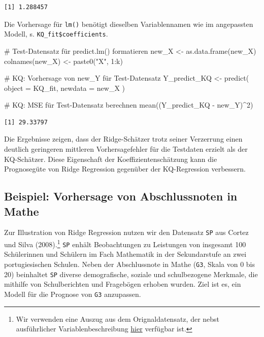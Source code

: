 \documentclass[
  a4paper,
  DIV=11,
  oneside]{scrreprt}
\newenvironment{Shaded}{\begin{snugshade}}{\end{snugshade}}
\newcommand{\AttributeTok}[1]{\textcolor[rgb]{0.40,0.45,0.13}{#1}}
\newcommand{\CommentTok}[1]{\textcolor[rgb]{0.37,0.37,0.37}{#1}}
\newcommand{\DecValTok}[1]{\textcolor[rgb]{0.68,0.00,0.00}{#1}}
\newcommand{\FunctionTok}[1]{\textcolor[rgb]{0.28,0.35,0.67}{#1}}
\newcommand{\NormalTok}[1]{\textcolor[rgb]{0.00,0.23,0.31}{#1}}
\newcommand{\OtherTok}[1]{\textcolor[rgb]{0.00,0.23,0.31}{#1}}
\newcommand{\SpecialCharTok}[1]{\textcolor[rgb]{0.37,0.37,0.37}{#1}}
\newcommand{\StringTok}[1]{\textcolor[rgb]{0.13,0.47,0.30}{#1}}
\begin{document}
\begin{verbatim}
[1] 1.288457
\end{verbatim}

Die Vorhersage für \texttt{lm()} benötigt dieselben Variablennamen wie
im angepassten Modell, s. \texttt{KQ\_fit\$coefficients}.

\begin{Shaded}
\begin{Highlighting}[]
\CommentTok{\# Test{-}Datensatz für predict.lm() formatieren}
\NormalTok{new\_X }\OtherTok{\textless{}{-}} \FunctionTok{as.data.frame}\NormalTok{(new\_X)}
\FunctionTok{colnames}\NormalTok{(new\_X) }\OtherTok{\textless{}{-}} \FunctionTok{paste0}\NormalTok{(}\StringTok{"X"}\NormalTok{, }\DecValTok{1}\SpecialCharTok{:}\NormalTok{k)}

\CommentTok{\# KQ: Vorhersage von new\_Y für Test{-}Datensatz}
\NormalTok{Y\_predict\_KQ }\OtherTok{\textless{}{-}} \FunctionTok{predict}\NormalTok{(}
  \AttributeTok{object =}\NormalTok{ KQ\_fit, }
  \AttributeTok{newdata =}\NormalTok{ new\_X}
\NormalTok{)}

\CommentTok{\# KQ: MSE für Test{-}Datensatz berechnen}
\FunctionTok{mean}\NormalTok{((Y\_predict\_KQ }\SpecialCharTok{{-}}\NormalTok{ new\_Y)}\SpecialCharTok{\^{}}\DecValTok{2}\NormalTok{)}
\end{Highlighting}
\end{Shaded}

\begin{verbatim}
[1] 29.33797
\end{verbatim}

Die Ergebnisse zeigen, dass der Ridge-Schätzer trotz seiner Verzerrung
einen deutlich geringeren mittleren Vorhersagefehler für die Testdaten
erzielt als der KQ-Schätzer. Diese Eigenschaft der
Koeffizientenschätzung kann die Prognosegüte von Ridge Regression
gegenüber der KQ-Regression verbessern.

\hypertarget{beispiel-vorhersage-von-abschlussnoten-in-mathe}{%
\subsection{Beispiel: Vorhersage von Abschlussnoten in
Mathe}\label{beispiel-vorhersage-von-abschlussnoten-in-mathe}}

Zur Illustration von Ridge Regression nutzen wir den Datensatz
\texttt{SP} aus Cortez und Silva (2008).\footnote{Wir verwenden eine
  Auszug aus dem Orignaldatensatz, der nebst ausführlicher
  Variablenbeschreibung
  \href{https://archive.ics.uci.edu/dataset/320/student+performance}{hier}
  verfügbar ist.} \texttt{SP} enhält Beobachtungen zu Leistungen von
insgesamt 100 Schülerinnen und Schülern im Fach Mathematik in der
Sekundarstufe an zwei portugiesischen Schulen. Neben der Abschlussnote
in Mathe (\texttt{G3}, Skala von 0 bis 20) beinhaltet \texttt{SP}
diverse demografische, soziale und schulbezogene Merkmale, die mithilfe
von Schulberichten und Fragebögen erhoben wurden. Ziel ist es, ein
Modell für die Prognose von \texttt{G3} anzupassen.
\end{document}
